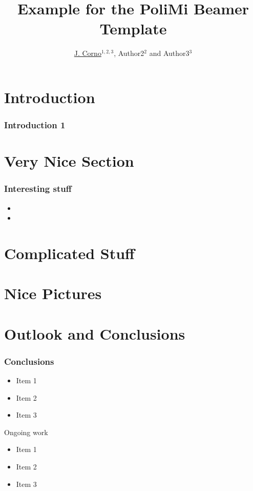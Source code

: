 \documentclass[british,xcolor={dvipsnames},9pt]{beamer}
\date[Politecnico di Milano]{\color{white}{Milano, 16.12.1988}}
\title[Short Example Title]{Example for the PoliMi Beamer Template}
\author[J. Corno]{\underline{J. Corno}$^{1,2,3}$, Author2$^{2}$ and Author3$^{3}$}
\institute[Politecnico di Milano]{
  \mbox{$^1$ Affiliation 1}\\
	\mbox{$^2$ Affiliation 2}\\
	\mbox{$^3$ Affiliation 3}}
\begin{document}
\polititlepage

\section{Introduction}


\begin{frame}
	\frametitle{Introduction 1}
	
	\lipsum[1]	
\end{frame}


\section{Very Nice Section}


\begin{frame}
	\frametitle{Interesting stuff}
	
	\begin{itemize}
	\item \lipsum[6]
	\pause
	\item \lipsum[9]
\end{itemize}		
\end{frame}


\section{Complicated Stuff}



\section{Nice Pictures}



\section{Outlook and Conclusions}
\begin{frame}
	\frametitle{Conclusions}
	\begin{itemize}
	  \item Item 1
		\item Item 2
		\item Item 3
	\end{itemize}
	\pause
	\vspace{.3cm}
	Ongoing work
	\begin{itemize}
		\item Item 1
		\item Item 2
		\item Item 3
	\end{itemize}
\end{frame}
\end{document}

